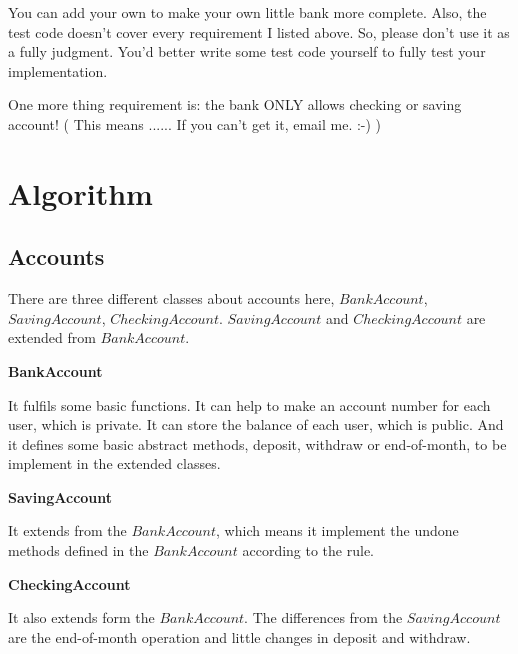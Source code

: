 \documentclass{article}
\begin{document}
You can add your own to make your own little bank more complete. Also, the test code doesn't cover every requirement I listed above. So, please don't use it as a fully judgment. You'd better write some test code yourself to fully test your implementation.

One more thing requirement is: the bank ONLY allows checking or saving account! ( This means ...... If you can't get it, email me. :-) )



\section{Algorithm}

\subsection{Accounts}
There are three different classes about accounts here, $BankAccount$, $SavingAccount$, $CheckingAccount$. $SavingAccount$ and $CheckingAccount$ are extended from $BankAccount$.
\begin{compactitem}
\item \textbf{BankAccount}

It fulfils some basic functions. It can help to make an account number for each user, which is private. It can store the balance of each user, which is public. And it defines some basic abstract methods, deposit, withdraw or end-of-month, to be implement in the extended classes.

\item \textbf{SavingAccount}

It extends from the $BankAccount$, which means it implement the undone methods defined in the $BankAccount$ according to the rule.
\item \textbf{CheckingAccount}

It also extends form the $BankAccount$. The differences from the $SavingAccount$ are the end-of-month operation and little changes in deposit and withdraw.
\end{compactitem}
\end{document}
